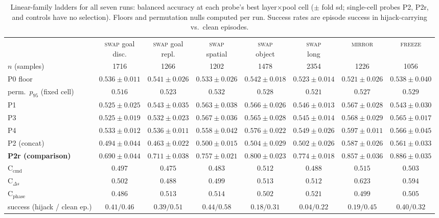 \documentclass{article}
\begin{document}
\begin{table}[h]
\caption{Linear-family ladders for all seven runs: balanced accuracy at each
probe's best layer$\times$pool cell ($\pm$ fold sd; single-cell probes P2,
P2r, and controls have no selection). Floors and permutation nulls computed
per run. Success rates are episode success in hijack-carrying vs.\ clean
episodes.}
\label{tab:arms-linear}
\vskip 0.1in
\centering
\scriptsize
\setlength{\tabcolsep}{2.5pt}
\begin{tabular}{lccccccc}
\toprule
& \shortstack{\textsc{swap} goal\\disc.} & \shortstack{\textsc{swap} goal\\repl.} & \shortstack{\textsc{swap}\\spatial} & \shortstack{\textsc{swap}\\object} & \shortstack{\textsc{swap}\\long} & \textsc{mirror} & \textsc{freeze} \\
$n$ (samples) & 1716 & 1266 & 1202 & 1478 & 2354 & 1226 & 1056 \\
\midrule
P0 floor & $0.536\pm0.011$ & $0.541\pm0.026$ & $0.533\pm0.026$ & $0.542\pm0.018$ & $0.523\pm0.014$ & $0.521\pm0.026$ & $0.538\pm0.040$ \\
perm.\ $p_{95}$ (fixed cell) & $0.516$ & $0.523$ & $0.532$ & $0.528$ & $0.521$ & $0.527$ & $0.529$ \\
P1 & $0.525\pm0.025$ & $0.543\pm0.035$ & $0.563\pm0.038$ & $0.566\pm0.026$ & $0.546\pm0.013$ & $0.567\pm0.028$ & $0.543\pm0.030$ \\
P3 & $0.525\pm0.019$ & $0.532\pm0.023$ & $0.567\pm0.036$ & $0.565\pm0.028$ & $0.545\pm0.014$ & $0.568\pm0.029$ & $0.565\pm0.017$ \\
P4 & $0.533\pm0.012$ & $0.536\pm0.011$ & $0.558\pm0.042$ & $0.576\pm0.022$ & $0.549\pm0.026$ & $0.597\pm0.011$ & $0.566\pm0.045$ \\
P2 (concat) & $0.494\pm0.044$ & $0.463\pm0.022$ & $0.500\pm0.015$ & $0.504\pm0.029$ & $0.502\pm0.026$ & $0.587\pm0.026$ & $0.561\pm0.033$ \\
\textbf{P2r (comparison)} & $\mathbf{0.690\pm0.044}$ & $\mathbf{0.711\pm0.038}$ & $\mathbf{0.757\pm0.021}$ & $\mathbf{0.800\pm0.023}$ & $\mathbf{0.774\pm0.018}$ & $\mathbf{0.857\pm0.036}$ & $\mathbf{0.886\pm0.035}$ \\
C$_{\text{cmd}}$ & $0.497$ & $0.475$ & $0.483$ & $0.512$ & $0.488$ & $0.515$ & $0.503$ \\
C$_{\Delta s}$ & $0.502$ & $0.488$ & $0.499$ & $0.513$ & $0.512$ & $0.623$ & $0.594$ \\
C$_{\text{phase}}$ & $0.486$ & $0.513$ & $0.514$ & $0.502$ & $0.521$ & $0.499$ & $0.505$ \\
success (hijack / clean ep.) & $0.41/0.46$ & $0.39/0.51$ & $0.44/0.58$ & $0.18/0.31$ & $0.04/0.22$ & $0.19/0.45$ & $0.40/0.32$ \\
\bottomrule
\end{tabular}
\end{table}
\end{document}

